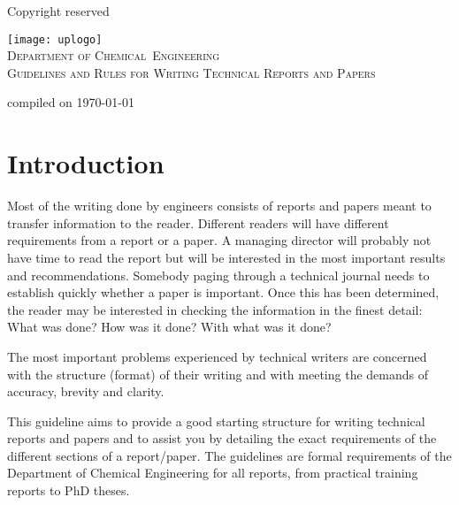 \documentclass[a5paper, 10pt]{article}
\begin{document}
\begin{titlepage}
  \begin{centering}
    \begin{flushright}Copyright reserved\end{flushright}
    \vfil
    \texttt{[image: uplogo]}\\
    \vfil
    {\Huge\scshape
    Department of Chemical~Engineering\\
    \vfil
    Guidelines and Rules for Writing Technical Reports and Papers\\}
  \vfil
  \vfil
  \begin{flushright}\small{compiled on \today}\end{flushright}
\end{centering}

\end{titlepage}

\pagestyle{empty}

\cleardoublepage

\setcounter{page}{1}
\pagestyle{plain}
\tableofcontents
\newpage

\pagestyle{empty}
\cleardoublepage
\setcounter{page}{1}
\pagestyle{plain}

\section{Introduction}
\label{cha:introduction}
Most of the writing done by engineers consists of reports and papers
meant to transfer information to the reader.  Different readers will
have different requirements from a report or a paper.  A managing
director will probably not have time to read the report but will be
interested in the most important results and recommendations.
Somebody paging through a technical journal needs to establish quickly
whether a paper is important.  Once this has been determined, the
reader may be interested in checking the information in the finest
detail: 
What was done?  
How was it done?  
With what was it done?

The most important problems experienced by technical writers are
concerned with the structure (format) of their writing and with
meeting the demands of accuracy, brevity and clarity.

This guideline aims to provide a good starting structure for writing
technical reports and papers and to assist you by detailing the
exact requirements of the different sections of a report/paper. The
guidelines are formal requirements of the Department of Chemical
Engineering for all reports, from practical training reports to PhD
theses.
\end{document}
